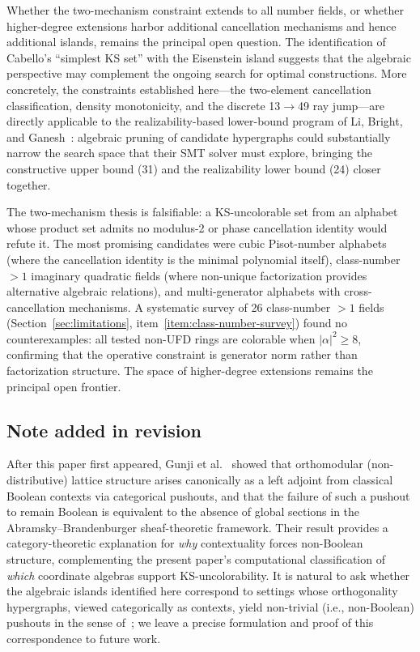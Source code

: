 \documentclass[12pt,a4paper]{article}
\begin{document}
Whether the two-mechanism constraint extends to all number fields, or whether higher-degree extensions harbor additional cancellation mechanisms and hence additional islands, remains the principal open question. The identification of Cabello's ``simplest KS set'' with the Eisenstein island suggests that the algebraic perspective may complement the ongoing search for optimal constructions. More concretely, the constraints established here---the two-element cancellation classification, density monotonicity, and the discrete 13$\to$49 ray jump---are directly applicable to the realizability-based lower-bound program of Li, Bright, and Ganesh~\cite{LiBrightGanesh2024}: algebraic pruning of candidate hypergraphs could substantially narrow the search space that their SMT solver must explore, bringing the constructive upper bound (31) and the realizability lower bound (24) closer together.

The two-mechanism thesis is falsifiable: a KS-uncolorable set from an alphabet whose product set admits no modulus-2 or phase cancellation identity would refute it. The most promising candidates were cubic Pisot-number alphabets (where the cancellation identity is the minimal polynomial itself), class-number $>1$ imaginary quadratic fields (where non-unique factorization provides alternative algebraic relations), and multi-generator alphabets with cross-cancellation mechanisms. A systematic survey of 26 class-number $> 1$ fields (Section~\ref{sec:limitations}, item~\ref{item:class-number-survey}) found no counterexamples: all tested non-UFD rings are colorable when $|\alpha|^2 \geq 8$, confirming that the operative constraint is generator norm rather than factorization structure. The space of higher-degree extensions remains the principal open frontier.

\subsection*{Note added in revision}

\begin{sloppypar}
After this paper first appeared, Gunji et al.~\cite{GunjiOhzawa2026} showed that orthomodular (non-distributive) lattice structure arises canonically as a left adjoint from classical Boolean contexts via categorical pushouts, and that the failure of such a pushout to remain Boolean is equivalent to the absence of global sections in the Abramsky--Brandenburger sheaf-theoretic framework.  Their result provides a category-theoretic explanation for \emph{why} contextuality forces non-Boolean structure, complementing the present paper's computational classification of \emph{which} coordinate algebras support KS-uncolorability.  It is natural to ask whether the algebraic islands identified here correspond to settings whose orthogonality hypergraphs, viewed categorically as contexts, yield non-trivial (i.e., non-Boolean) pushouts in the sense of~\cite{GunjiOhzawa2026}; we leave a precise formulation and proof of this correspondence to future work.
\end{sloppypar}
\end{document}
